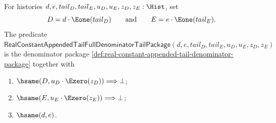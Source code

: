 \begin{definition}
\label{def:real-constant-appended-tail-full-denominator-tail-package}
For histories $d,e,tail_D,tail_E,u_D,u_E,z_D,z_E:\Hist$, set
$$
D=d\cdot\Eone(tail_D)
\qquad\text{and}\qquad
E=e\cdot\Eone(tail_E).
$$
The predicate
$\mathsf{RealConstantAppendedTailFullDenominatorTailPackage}
(d,e,tail_D,tail_E,u_D,u_E,z_D,z_E)$ is the denominator package
\autoref{def:real-constant-appended-tail-denominator-package} together with
\begin{enumerate}
  \item $\hsame(D,u_D\cdot\Ezero(z_D))\Longrightarrow\bot$;
  \item $\hsame(E,u_E\cdot\Ezero(z_E))\Longrightarrow\bot$;
  \item $\hsame(d,e)$.
\end{enumerate}
\end{definition}

